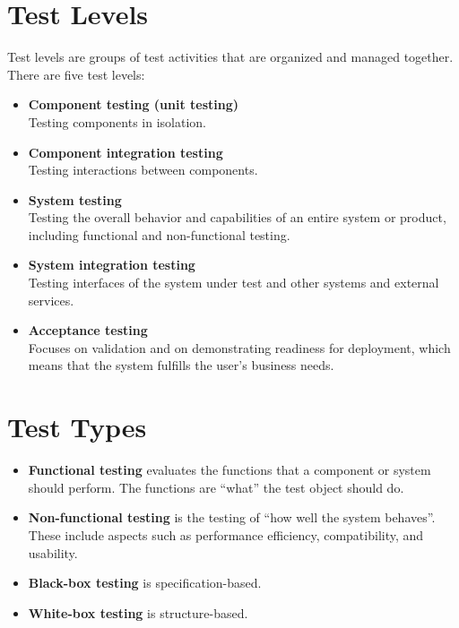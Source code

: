 \documentclass{article}
\begin{document}
\begin{multicols}{3}
{\section*{Test Levels}
Test levels are groups of test activities that are organized and managed together. There are five test levels:
\begin{itemize}
  \item \textbf{Component testing (unit testing)}\\
  Testing components in isolation.
  
  \item \textbf{Component integration testing}\\
  Testing interactions between components.
  
  \item \textbf{System testing}\\
  Testing the overall behavior and capabilities of an entire system or product, including functional and non-functional testing.
  
  \item \textbf{System integration testing}\\
  Testing interfaces of the system under test and other systems and external services.
  
  \item \textbf{Acceptance testing}\\
  Focuses on validation and on demonstrating readiness for deployment, which means that the system fulfills the user’s business needs.
\end{itemize}

\section*{Test Types}
\begin{itemize}
  \item \textbf{Functional testing} evaluates the functions that a component or system should perform. The functions are “what” the test object should do.
  \item \textbf{Non-functional testing} is the testing of “how well the system behaves”. These include aspects such as performance efficiency, compatibility, and usability.
  \item \textbf{Black-box testing} is specification-based.
  \item \textbf{White-box testing} is structure-based.
\end{itemize}

}
\end{multicols}
\end{document}
